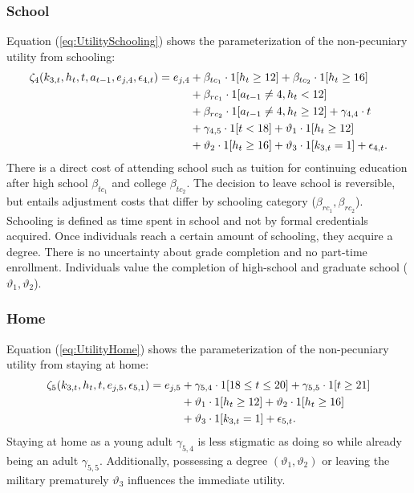 \subsubsection*{School}
Equation (\ref{eq:UtilitySchooling}) shows the parameterization of the non-pecuniary utility from schooling:
%
\begin{align}\label{eq:UtilitySchooling}
	\zeta_4(k_{3,t}, h_t, t, a_{t-1}, e_{j,4}, \epsilon_{4,t})  = e_{j,4} & + \beta_{tc_1} \cdot 1[h_t \geq 12] + \beta_{tc_2} \cdot 1[h_t \geq 16]   \\\nonumber
    							  & + \beta_{rc_1} \cdot 1[a_{t-1} \neq 4, h_t < 12]  \\\nonumber
    							  & + \beta_{rc_2} \cdot 1[a_{t-1} \neq 4, h_t \geq 12]+ \gamma_{4,4} \cdot t  \\\nonumber
     							  & + \gamma_{4,5} \cdot 1[t < 18] + \vartheta_1 \cdot 1[h_t \geq 12]  \\\nonumber
      							& + \vartheta_2 \cdot 1[h_t \geq 16]+ \vartheta_3 \cdot 1[k_{3,t} = 1] + \epsilon_{4,t}.
\end{align}
%
There is a direct cost of attending school such as tuition for continuing education after high school $\beta_{tc_1}$ and college $\beta_{tc_2}$. The decision to leave school is reversible, but entails adjustment costs that differ by schooling category ($\beta_{rc_1}, \beta_{rc_2}$). Schooling is defined as time spent in school and not by formal credentials acquired. Once individuals reach a certain amount of schooling, they acquire a degree. There is no uncertainty about grade completion \citep{Altonji.1993} and no part-time enrollment. Individuals value the completion of high-school and graduate school ($\vartheta_1, \vartheta_2$).
\subsubsection*{Home}
Equation (\ref{eq:UtilityHome}) shows the parameterization of the non-pecuniary utility from staying at home:
%
\begin{align}\label{eq:UtilityHome}
	\zeta_5(k_{3,t}, h_t, t, e_{j,5}, \epsilon_{5,1}) =  e_{j,5} & + \gamma_{5,4} \cdot 1[18 \leq t \leq 20] + \gamma_{5,5} \cdot 1[t \geq 21] \\ \nonumber
    							   & +\vartheta_{1} \cdot 1[h_t \geq 12] + \vartheta_{2} \cdot 1[h_t \geq 16] \\ \nonumber
    							   & +  \vartheta_3 \cdot 1[k_{3,t} = 1]+ \epsilon_{5,t}.
\end{align}
%
Staying at home as a young adult $\gamma_{5, 4}$ is less stigmatic as doing so while already being an adult $\gamma_{5,5}$. Additionally, possessing a degree  $(\vartheta_1, \vartheta_2)$ or leaving the military prematurely $\vartheta_3$ influences the immediate utility.
